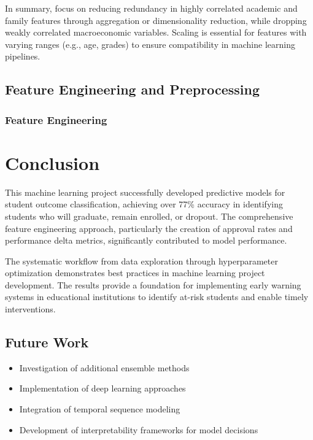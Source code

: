 \documentclass[twoside,final]{hcmut-report}
\begin{document}
In summary, focus on reducing redundancy in highly correlated academic and family features through aggregation or dimensionality reduction, while dropping weakly correlated macroeconomic variables. Scaling is essential for features with varying ranges (e.g., age, grades) to ensure compatibility in machine learning pipelines.

\subsection{Feature Engineering and Preprocessing}

\subsubsection{Feature Engineering}

\newpage\section{Conclusion}

This machine learning project successfully developed predictive models for student outcome classification, achieving over 77\% accuracy in identifying students who will graduate, remain enrolled, or dropout. The comprehensive feature engineering approach, particularly the creation of approval rates and performance delta metrics, significantly contributed to model performance.

The systematic workflow from data exploration through hyperparameter optimization demonstrates best practices in machine learning project development. The results provide a foundation for implementing early warning systems in educational institutions to identify at-risk students and enable timely interventions.

\subsection{Future Work}

\begin{itemize}
  \item Investigation of additional ensemble methods
  \item Implementation of deep learning approaches
  \item Integration of temporal sequence modeling
  \item Development of interpretability frameworks for model decisions
\end{itemize}
\end{document}

